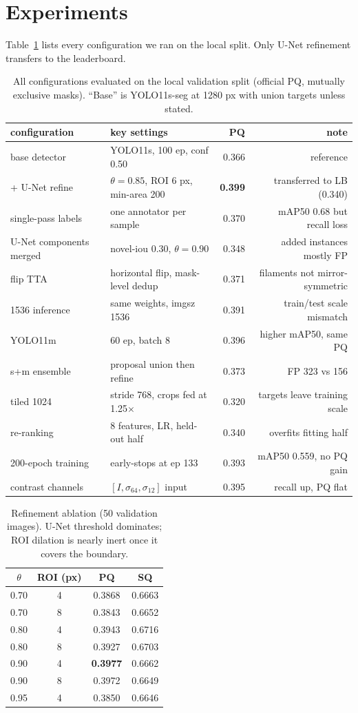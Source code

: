 \documentclass[conference]{IEEEtran}
\begin{document}
\section{Experiments}
Table~\ref{tab:exps} lists every configuration we ran on the local split. Only U-Net refinement transfers to the leaderboard.
\begin{table}[t]
\centering
\caption{All configurations evaluated on the local validation split (official PQ, mutually exclusive masks). ``Base'' is YOLO11s-seg at 1280 px with union targets unless stated.}
\label{tab:exps}
\begin{tabular}{llrr}
\toprule
configuration & key settings & PQ & note\\
\midrule
base detector & YOLO11s, 100 ep, conf 0.50 & 0.366 & reference\\
+ U-Net refine & $\theta=0.85$, ROI 6 px, min-area 200 & \textbf{0.399} & transferred to LB (0.340)\\
single-pass labels & one annotator per sample & 0.370 & mAP50 0.68 but recall loss\\
U-Net components merged & novel-iou 0.30, $\theta=0.90$ & 0.348 & added instances mostly FP\\
flip TTA & horizontal flip, mask-level dedup & 0.371 & filaments not mirror-symmetric\\
1536 inference & same weights, imgsz 1536 & 0.391 & train/test scale mismatch\\
YOLO11m & 60 ep, batch 8 & 0.396 & higher mAP50, same PQ\\
s+m ensemble & proposal union then refine & 0.373 & FP 323 vs 156\\
tiled 1024 & stride 768, crops fed at 1.25$\times$ & 0.320 & targets leave training scale\\
re-ranking & 8 features, LR, held-out half & 0.340 & overfits fitting half\\
200-epoch training & early-stops at ep 133 & 0.393 & mAP50 0.559, no PQ gain\\
contrast channels & $[I,\sigma_{64},\sigma_{12}]$ input & 0.395 & recall up, PQ flat\\
\bottomrule
\end{tabular}
\end{table}
\begin{table}[t]
\centering
\caption{Refinement ablation (50 validation images). U-Net threshold dominates; ROI dilation is nearly inert once it covers the boundary.}
\label{tab:ablate}
\begin{tabular}{cccc}
\toprule
$\theta$ & ROI (px) & PQ & SQ\\
\midrule
0.70 & 4 & 0.3868 & 0.6663\\
0.70 & 8 & 0.3843 & 0.6652\\
0.80 & 4 & 0.3943 & 0.6716\\
0.80 & 8 & 0.3927 & 0.6703\\
0.90 & 4 & \textbf{0.3977} & 0.6662\\
0.90 & 8 & 0.3972 & 0.6649\\
0.95 & 4 & 0.3850 & 0.6646\\
\bottomrule
\end{tabular}
\end{table}
\end{document}
